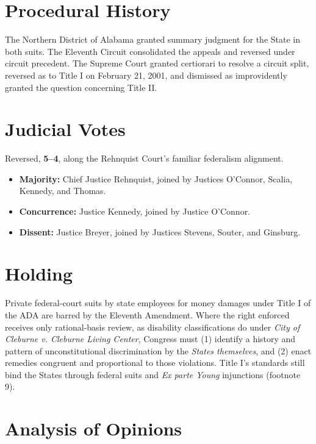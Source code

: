 \documentclass[12pt]{article}
\begin{document}
\section{Procedural History}

The Northern District of Alabama granted summary judgment for the State in both suits. The Eleventh Circuit consolidated the appeals and reversed under circuit precedent. The Supreme Court granted certiorari to resolve a circuit split, reversed as to Title I on February 21, 2001, and dismissed as improvidently granted the question concerning Title II.

\section{Judicial Votes}

Reversed, \textbf{5--4}, along the Rehnquist Court's familiar federalism alignment.
\begin{itemize}
\item \textbf{Majority:} Chief Justice Rehnquist, joined by Justices O'Connor, Scalia, Kennedy, and Thomas.
\item \textbf{Concurrence:} Justice Kennedy, joined by Justice O'Connor.
\item \textbf{Dissent:} Justice Breyer, joined by Justices Stevens, Souter, and Ginsburg.
\end{itemize}

\section{Holding}

Private federal-court suits by state employees for money damages under Title I of the ADA are barred by the Eleventh Amendment. Where the right enforced receives only rational-basis review, as disability classifications do under \textit{City of Cleburne v. Cleburne Living Center}, Congress must (1) identify a history and pattern of unconstitutional discrimination by the \textit{States themselves}, and (2) enact remedies congruent and proportional to those violations. Title I's standards still bind the States through federal suits and \textit{Ex parte Young} injunctions (footnote 9).

\section{Analysis of Opinions}
\end{document}
